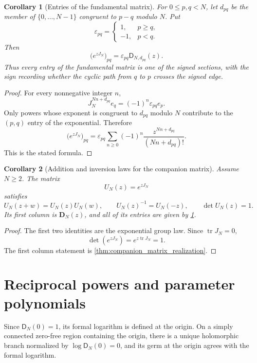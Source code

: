 \documentclass[11pt]{article}
\newtheorem{corollary}[corollary]{Corollary}
\theoremstyle{definition}
\theoremstyle{remark}
\newcommand{\Dfun}{\mathsf D}
\newcommand{\tr}{\operatorname{tr}}
\begin{document}
\begin{corollary}[Entries of the fundamental matrix]\label{cor:fundamental_matrix_entries}
For $0\leq p,q<N$, let $d_{pq}$ be the member of $\{0,\ldots,N-1\}$ congruent to $p-q$ modulo $N$.  Put
\[
\varepsilon_{pq}
=
\begin{cases}
1,&p\geq q,\\
-1,&p<q.
\end{cases}
\]
Then
\[
\bigl(e^{zJ_N}\bigr)_{pq}
=
\varepsilon_{pq}\Dfun_{N,d_{pq}}(z).
\]
Thus every entry of the fundamental matrix is one of the signed sections, with the sign recording whether the cyclic path from $q$ to $p$ crosses the signed edge.
\end{corollary}

\begin{proof}
For every nonnegative integer $n$,
\[
J_N^{Nn+d_{pq}}e_q
=
(-1)^n\varepsilon_{pq}e_p.
\]
Only powers whose exponent is congruent to $d_{pq}$ modulo $N$ contribute to the $(p,q)$ entry of the exponential.  Therefore
\[
\bigl(e^{zJ_N}\bigr)_{pq}
=
\varepsilon_{pq}
\sum_{n\geq0}(-1)^n
\frac{z^{Nn+d_{pq}}}{(Nn+d_{pq})!}.
\]
This is the stated formula.
\end{proof}

\begin{corollary}[Addition and inversion laws for the companion matrix]\label{cor:companion_addition_inversion}
Assume $N\geq2$.  The matrix
\[
U_N(z)=e^{zJ_N}
\]
satisfies
\[
U_N(z+w)=U_N(z)U_N(w),
\qquad
U_N(z)^{-1}=U_N(-z),
\qquad
\det U_N(z)=1.
\]
Its first column is $\mathbf D_N(z)$, and all of its entries are given by \cref{cor:fundamental_matrix_entries}.
\end{corollary}

\begin{proof}
The first two identities are the exponential group law.  Since $\tr J_N=0$,
\[
\det(e^{zJ_N})=e^{z\tr J_N}=1.
\]
The first column statement is \cref{thm:companion_matrix_realization}.
\end{proof}

\section{Reciprocal powers and parameter polynomials}\label{sec:reciprocal_powers}

Since $\Dfun_N(0)=1$, its formal logarithm is defined at the origin.  On a
simply connected zero-free region containing the origin, there is a unique
holomorphic branch normalized by $\log\Dfun_N(0)=0$, and its germ at the
origin agrees with the formal logarithm.
\end{document}
